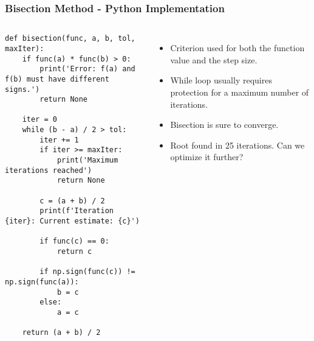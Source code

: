 \begin{frame}[fragile]
  \frametitle{Bisection Method - Python Implementation} 
  \begin{columns}
    \begin{lstlisting}[style=tiny]
def bisection(func, a, b, tol, maxIter):
    if func(a) * func(b) > 0:
        print('Error: f(a) and f(b) must have different signs.')
        return None

    iter = 0
    while (b - a) / 2 > tol:
        iter += 1
        if iter >= maxIter:
            print('Maximum iterations reached')
            return None

        c = (a + b) / 2
        print(f'Iteration {iter}: Current estimate: {c}')

        if func(c) == 0:
            return c

        if np.sign(func(c)) != np.sign(func(a)):
            b = c
        else:
            a = c

    return (a + b) / 2
      \end{lstlisting}

    \vspace{-1cm}
    \begin{itemize}
      \item Criterion used for both the function value and the step size.
      \item While loop usually requires protection for a maximum number of iterations.
      \item Bisection is sure to converge.
      \item Root found in 25 iterations. Can we optimize it further?
    \end{itemize}
  \end{columns}
\end{frame}


